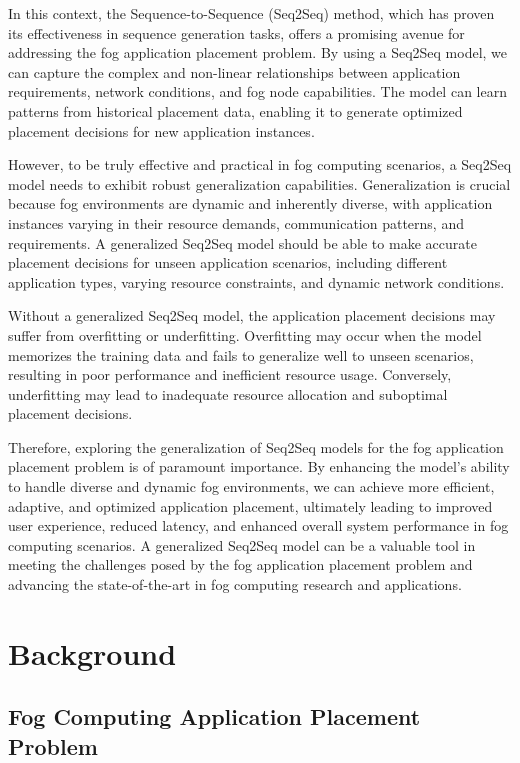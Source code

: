\documentclass[conference]{IEEEtran}
\begin{document}
In this context, the Sequence-to-Sequence (Seq2Seq) method, which has proven its effectiveness in sequence generation tasks, offers a promising avenue for addressing the fog application placement problem. By using a Seq2Seq model, we can capture the complex and non-linear relationships between application requirements, network conditions, and fog node capabilities. The model can learn patterns from historical placement data, enabling it to generate optimized placement decisions for new application instances.

However, to be truly effective and practical in fog computing scenarios, a Seq2Seq model needs to exhibit robust generalization capabilities. Generalization is crucial because fog environments are dynamic and inherently diverse, with application instances varying in their resource demands, communication patterns, and requirements. A generalized Seq2Seq model should be able to make accurate placement decisions for unseen application scenarios, including different application types, varying resource constraints, and dynamic network conditions.

Without a generalized Seq2Seq model, the application placement decisions may suffer from overfitting or underfitting. Overfitting may occur when the model memorizes the training data and fails to generalize well to unseen scenarios, resulting in poor performance and inefficient resource usage. Conversely, underfitting may lead to inadequate resource allocation and suboptimal placement decisions.

Therefore, exploring the generalization of Seq2Seq models for the fog application placement problem is of paramount importance. By enhancing the model's ability to handle diverse and dynamic fog environments, we can achieve more efficient, adaptive, and optimized application placement, ultimately leading to improved user experience, reduced latency, and enhanced overall system performance in fog computing scenarios. A generalized Seq2Seq model can be a valuable tool in meeting the challenges posed by the fog application placement problem and advancing the state-of-the-art in fog computing research and applications.

\section{Background}

\subsection{Fog Computing Application Placement Problem}
\end{document}
